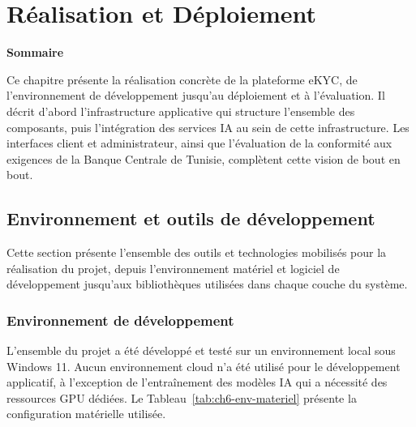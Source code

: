 
\chapter{Réalisation et Déploiement}
\label{chap:realisation}
\vspace{1em}
\noindent\textbf{\large Sommaire}
\vspace{0.5em}
\localtableofcontents
\clearpage

Ce chapitre présente la réalisation concrète de la plateforme eKYC, de l'environnement de développement jusqu'au déploiement et à l'évaluation. Il décrit d'abord l'infrastructure applicative qui structure l'ensemble des composants, puis l'intégration des services IA au sein de cette infrastructure. Les interfaces client et administrateur, ainsi que l'évaluation de la conformité aux exigences de la Banque Centrale de Tunisie, complètent cette vision de bout en bout.

\section{Environnement et outils de développement}
\label{sec:env-dev}

Cette section présente l'ensemble des outils et technologies mobilisés pour la réalisation du projet, depuis l'environnement matériel et logiciel de développement jusqu'aux bibliothèques utilisées dans chaque couche du système.

\subsection{Environnement de développement}
\label{subsec:env-materiel}

L'ensemble du projet a été développé et testé sur un environnement local sous Windows 11. Aucun environnement cloud n'a été utilisé pour le développement applicatif, à l'exception de l'entraînement des modèles IA qui a nécessité des ressources GPU dédiées. Le Tableau~\ref{tab:ch6-env-materiel} présente la configuration matérielle utilisée.

